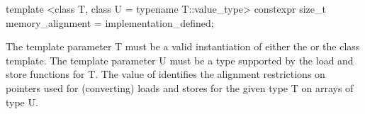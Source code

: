 \begin{itemdecl}
template <class T, class U = typename T::value_type>
constexpr size_t memory_alignment = implementation_defined;
\end{itemdecl}
\begin{itemdescr}
  \pnum\requires The template parameter \type T must be a valid instantiation of either the \datapar or the \mask class template.
  \pnum\requires The template parameter \type U must be a type supported by the load and store functions for \type T.
  \pnum The value of  identifies the alignment restrictions on pointers used for (converting) loads and stores for the given type \type T on arrays of type \type U.
\end{itemdescr}

